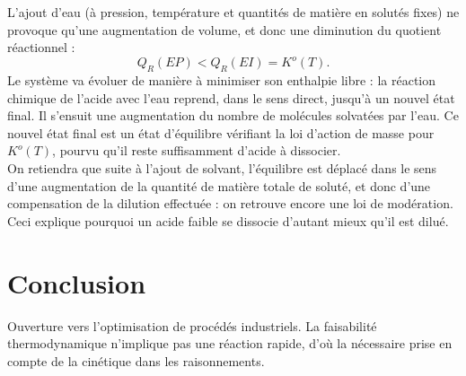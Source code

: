 \documentclass[11pt,a4paper]{report}
\begin{document}
L'ajout d'eau (à pression, température et quantités de matière en solutés fixes) ne provoque qu'une augmentation de volume, et donc une diminution du quotient réactionnel :
\begin{equation}
	Q_R(EP) < Q_R(EI) = K^o(T).
\end{equation}
Le système va évoluer de manière à minimiser son enthalpie libre : la réaction chimique de l'acide avec l'eau reprend, dans le sens direct, jusqu'à un nouvel état final. Il s'ensuit une augmentation du nombre de molécules solvatées par l'eau. Ce nouvel état final est un état d'équilibre vérifiant la loi d'action de masse pour $K^o(T)$, pourvu qu'il reste suffisamment d'acide à dissocier.\\

On retiendra que suite à l'ajout de solvant, l'équilibre est déplacé dans le sens d'une augmentation de la quantité de matière totale de soluté, et donc d'une compensation de la dilution effectuée : on retrouve encore une loi de modération. Ceci explique pourquoi un acide faible se dissocie d'autant mieux qu'il est dilué.

\section{Conclusion}

Ouverture vers l'optimisation de procédés industriels. La faisabilité thermodynamique n'implique pas une réaction rapide, d'où la nécessaire prise en compte de la cinétique dans les raisonnements.
\end{document}
